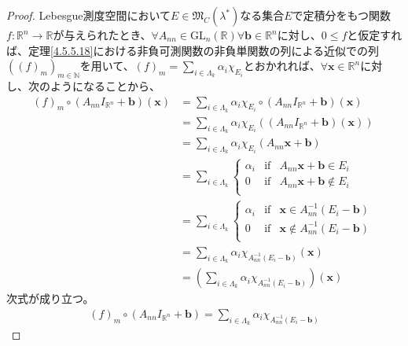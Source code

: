 \documentclass[dvipdfmx]{jsarticle}
\begin{document}
\begin{proof}
Lebesgue測度空間において$E \in \mathfrak{M}_{C}\left( \lambda^{*} \right)$なる集合$E$で定積分をもつ関数$f:\mathbb{R}^{n} \rightarrow \mathbb{R}$が与えられたとき、$\forall A_{nn} \in \mathrm{GL}_{n}\left( \mathbb{R} \right)\forall\mathbf{b} \in \mathbb{R}^{n}$に対し、$0 \leq f$と仮定すれば、定理\ref{4.5.5.18}における非負可測関数の非負単関数の列による近似での列$\left( (f)_{m} \right)_{m \in \mathbb{N}}$を用いて、$(f)_{m} = \sum_{i \in \varLambda_{k}} {\alpha_{i}\chi_{E_{i}}}$とおかれれば、$\forall\mathbf{x} \in \mathbb{R}^{n}$に対し、次のようになることから、
\begin{align*}
(f)_{m} \circ \left( A_{nn}I_{\mathbb{R}^{n}} + \mathbf{b} \right)\left( \mathbf{x} \right) &= \sum_{i \in \varLambda_{k}} {\alpha_{i}\chi_{E_{i}}} \circ \left( A_{nn}I_{\mathbb{R}^{n}} + \mathbf{b} \right)\left( \mathbf{x} \right)\\
&= \sum_{i \in \varLambda_{k}} {\alpha_{i}\chi_{E_{i}}\left( \left( A_{nn}I_{\mathbb{R}^{n}} + \mathbf{b} \right)\left( \mathbf{x} \right) \right)}\\
&= \sum_{i \in \varLambda_{k}} {\alpha_{i}\chi_{E_{i}}\left( A_{nn}\mathbf{x} + \mathbf{b} \right)}\\
&= \sum_{i \in \varLambda_{k}} \left\{ \begin{matrix}
\alpha_{i} & \mathrm{if} & A_{nn}\mathbf{x} + \mathbf{b} \in E_{i} \\
0 & \mathrm{if} & A_{nn}\mathbf{x} + \mathbf{b} \notin E_{i} \\
\end{matrix} \right.\ \\
&= \sum_{i \in \varLambda_{k}} \left\{ \begin{matrix}
\alpha_{i} & \mathrm{if} & \mathbf{x} \in A_{nn}^{- 1}\left( E_{i} - \mathbf{b} \right) \\
0 & \mathrm{if} & \mathbf{x} \notin A_{nn}^{- 1}\left( E_{i} - \mathbf{b} \right) \\
\end{matrix} \right.\ \\
&= \sum_{i \in \varLambda_{k}} {\alpha_{i}\chi_{A_{nn}^{- 1}\left( E_{i} - \mathbf{b} \right)}\left( \mathbf{x} \right)}\\
&= \left( \sum_{i \in \varLambda_{k}} {\alpha_{i}\chi_{A_{nn}^{- 1}\left( E_{i} - \mathbf{b} \right)}} \right)\left( \mathbf{x} \right)
\end{align*}
次式が成り立つ。
\begin{align*}
(f)_{m} \circ \left( A_{nn}I_{\mathbb{R}^{n}} + \mathbf{b} \right) = \sum_{i \in \varLambda_{k}} {\alpha_{i}\chi_{A_{nn}^{- 1}\left( E_{i} - \mathbf{b} \right)}}

\end{align*}
\end{proof}
\end{document}
